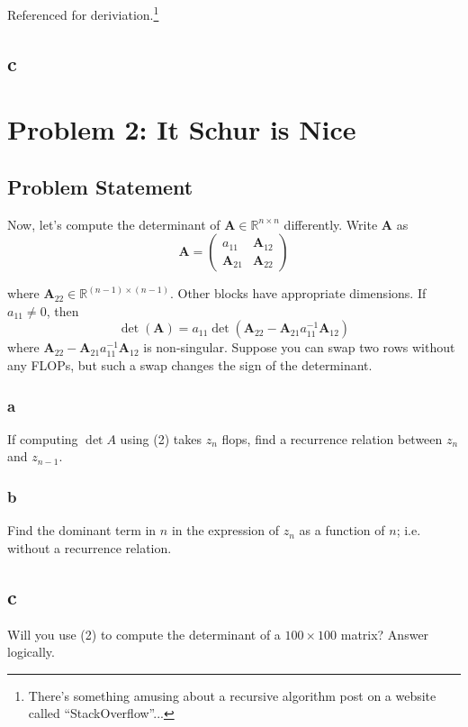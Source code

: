 \documentclass[11pt]{report}
\theoremstyle{definition}
\newcommand{\mat}[1]{\mathbf{#1}}
\begin{document}
Referenced \cite{DeterminantStackOverflow} for deriviation.\footnote{There's
	something amusing about a recursive algorithm post on a website called
	``StackOverflow''...}


\subsection*{c}

\newpage

\section*{Problem 2: It Schur is Nice}
\subsection*{Problem Statement}
Now, let's compute the determinant of $\mat{A}\in\mathbb{R}^{n\times n}$ differently.
Write $\mat{A}$ as
\begin{equation}
	\mat{A} = \begin{pmatrix}
		a_{11}       & \mat{A}_{12} \\
		\mat{A}_{21} & \mat{A}_{22}
	\end{pmatrix}
\end{equation}

where $\mat{A}_{22}\in\mathbb{R}^{(n-1)\times(n-1)}$. Other blocks have
appropriate dimensions.  If $a_{11}\neq 0$, then
\[ \det(\mat{A})=a_{11}\det(\mat{A}_{22}-\mat{A}_{21}a_{11}^{-1}\mat{A}_{12}) \]
where $\mat{A}_{22}-\mat{A}_{21}a_{11}^{-1}\mat{A}_{12}$ is non-singular.
Suppose you can swap two rows without any FLOPs, but such a swap changes the
sign of the determinant.

\subsubsection*{a}
If computing $\det{A}$ using (2) takes $z_n$ flops, find a recurrence relation
between $z_n$ and $z_{n-1}$.

\subsubsection*{b}
Find the dominant term in $n$ in the expression of $z_n$ as a function of $n$;
i.e. without a recurrence relation.

\subsection*{c}
Will you use (2) to compute the determinant of a $100\times 100$ matrix? Answer
logically.
\end{document}
